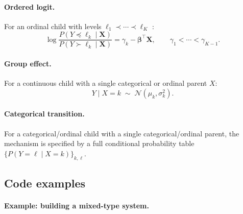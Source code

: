 \documentclass[12pt,a4paper]{article}
\begin{document}
\paragraph{Ordered logit.}
For an ordinal child with levels $\ell_1\prec\cdots\prec\ell_K$
\citep{mccullagh1980regression}:
\begin{equation}
  \log\frac{P(Y\preceq\ell_k\mid\mathbf{X})}{P(Y\succ\ell_k\mid\mathbf{X})}
  = \gamma_k - \boldsymbol\beta^\top\mathbf{X}, \qquad
  \gamma_1 < \cdots < \gamma_{K-1}.
  \label{eq:ordered_logit}
\end{equation}

\paragraph{Group effect.}
For a continuous child with a single categorical or ordinal parent $X$:
\begin{equation}
  Y \mid X = k \;\sim\; \mathcal{N}(\mu_k, \sigma_k^2).
  \label{eq:group_effect}
\end{equation}

\paragraph{Categorical transition.}
For a categorical/ordinal child with a single categorical/ordinal parent, the
mechanism is specified by a full conditional probability table
$\{P(Y = \ell \mid X = k)\}_{k,\ell}$.

\subsection{Code examples}
\label{sec:mech_code}

\paragraph{Example: building a mixed-type system.}
\end{document}
